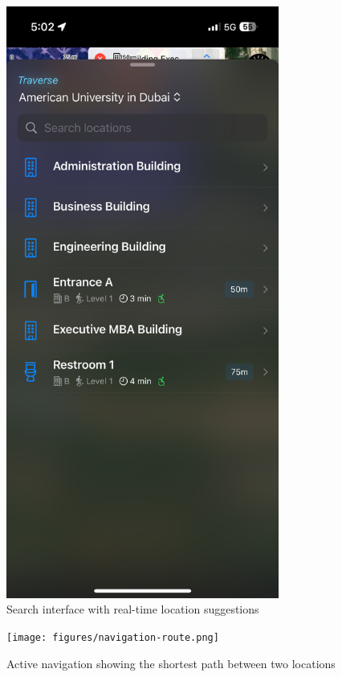 \documentclass{article}
\begin{document}
\begin{figure}[h]
    \centering
    \includegraphics[width=0.8\textwidth]{figures/search-interface.png}
    \caption{Search interface with real-time location suggestions}
    \label{fig:search-interface}
\end{figure}

\begin{figure}[h]
    \centering
    \texttt{[image: figures/navigation-route.png]}
    \caption{Active navigation showing the shortest path between two locations}
    \label{fig:navigation-route}
\end{figure}
\end{document}
